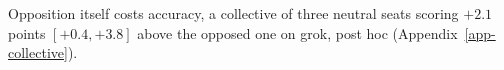 Opposition itself costs accuracy, a collective of three neutral seats
scoring $+2.1$ points $[+0.4, +3.8]$ above the opposed one on grok, post hoc
(Appendix~\ref{app-collective}).

